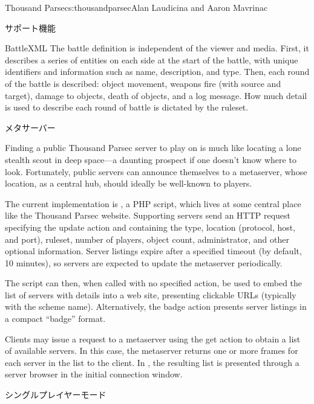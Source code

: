 \begin{aosachapter}{Thousand Parsec}{s:thousandparsec}{Alan Laudicina and Aaron Mavrinac}
\begin{aosasect1}{サポート機能}
\begin{aosasect2}{BattleXML}
The battle definition is independent of the viewer and media. First,
it describes a series of entities on each side at the start of the
battle, with unique identifiers and information such as name,
description, and type. Then, each round of the battle is described:
object movement, weapons fire (with source and target), damage to
objects, death of objects, and a log message. How much detail is used
to describe each round of battle is dictated by the ruleset.

\end{aosasect2}

\begin{aosasect2}{メタサーバー}

Finding a public Thousand Parsec server to play on 
is much like locating a lone stealth scout in deep space---a
daunting prospect if one doesn't know where to look. Fortunately,
public servers can announce themselves to a metaserver, whose
location, as a central hub, should ideally be well-known to players.

The current implementation is , a PHP script,
which lives at some central place like the Thousand Parsec
website. Supporting servers send an HTTP request specifying the update
action and containing the type, location (protocol, host, and port),
ruleset, number of players, object count, administrator, and other
optional information. Server listings expire after a specified timeout
(by default, 10 minutes), so servers are expected to update the
metaserver periodically.

The script can then, when called with no specified action, be used to
embed the list of servers with details into a web site, presenting
clickable URLs (typically with the  scheme
name). Alternatively, the badge action presents server listings in a
compact ``badge'' format.

Clients may issue a request to a metaserver using the get action to
obtain a list of available servers. In this case, the metaserver
returns one or more  frames for each server in the list to
the client. In , the resulting list is presented
through a server browser in the initial connection window.

\end{aosasect2}

\begin{aosasect2}{シングルプレイヤーモード}


\end{aosasect2}
\end{aosasect1}
\end{aosachapter}
